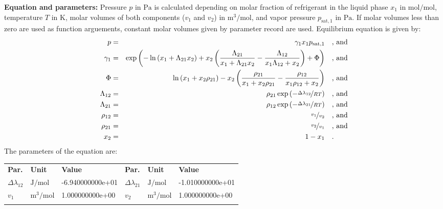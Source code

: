 \textbf{Equation and parameters:}
\newline
%
Pressure $p$ in $\si{\pascal}$ is calculated depending on molar fraction of refrigerant in the liquid phase $x_1$ in $\si{\mole\per\mole}$, temperature $T$ in $\si{\kelvin}$, molar volumes of both components ($v_1$ and $v_2$) in $\si{\cubic\meter\per\mole}$, and vapor pressure $p_\mathrm{sat,1}$ in $\si{\pascal}$. If molar volumes less than zero are used as function arguements, constant molar volumes given by parameter record are used. Equilibrium equation is given by:
%
\begin{equation*}
\begin{split}
p &=& \gamma_1 x_1 p_\mathrm{sat,1} & \quad\text{, and} \\
\gamma_1 &=& \exp \left( - \ln \left( x_1 + \Lambda_{21} x_2 \right) + x_2 \left( \frac{\Lambda_{21}}{x_1 + \Lambda_{21} x_2} - \frac{\Lambda_{12}}{x_1 \Lambda_{12} + x_2} \right) + \Phi \right) & \quad\text{, and} \\
\Phi &=& \ln \left( x_1 + x_2 \rho_{21} \right) - x_2 \left( \frac{\rho_{21}}{x_1 + x_2 \rho_{21}} - \frac{\rho_{12}}{x_1 \rho_{12} + x_2} \right) & \quad\text{, and} \\
\Lambda_{12} &=& \rho_{21} \exp \left( - \nicefrac{\Delta\lambda_{12}}{R T} \right) & \quad\text{, and} \\
\Lambda_{21} &=& \rho_{12} \exp \left( - \nicefrac{\Delta\lambda_{21}}{R T} \right) & \quad\text{, and} \\
\rho_{12} &=& \nicefrac{v_1}{v_2} & \quad\text{, and} \\
\rho_{21} &=& \nicefrac{v_2}{v_1} & \quad\text{, and} \\
x_2 &=& 1 - x_1  & \quad\text{.} \\
\end{split}
\end{equation*}
%
The parameters of the equation are:
%
\begin{longtable}[l]{lll|lll}
\toprule
\addlinespace
\textbf{Par.} & \textbf{Unit} & \textbf{Value} &	\textbf{Par.} & \textbf{Unit} & \textbf{Value} \\
\addlinespace
\midrule
\endhead

\bottomrule
\endfoot
\bottomrule
\endlastfoot
\addlinespace

$\Delta\lambda_{12}$ & $\si{\joule\per\mole}$ & -6.940000000e+01 & $\Delta\lambda_{21}$ & $\si{\joule\per\mole}$ & -1.010000000e+01 \\
$v_1$ & $\si{\cubic\meter\per\mole}$ & 1.000000000e+00 & $v_2$ & $\si{\cubic\meter\per\mole}$ & 1.000000000e+00 \\

\addlinespace\end{longtable}

